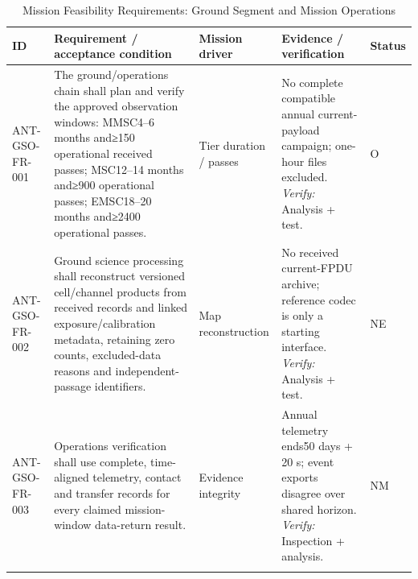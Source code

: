 \begin{table}[H]\centering\small\setlength{\tabcolsep}{3pt}
\caption{Mission Feasibility Requirements: Ground Segment and Mission Operations}\label{tab:fr-gso}
\begin{tabular}{@{}
>{\RaggedRight\arraybackslash}p{}
>{\RaggedRight\arraybackslash}p{}
>{\RaggedRight\arraybackslash}p{}
>{\RaggedRight\arraybackslash}p{}
>{\RaggedRight\arraybackslash}p{}
@{}}
\toprule ID & Requirement / acceptance condition & Mission driver & Evidence / verification & Status\\\midrule
{}\label{req:ANT-GSO-FR-001}\mbox{ANT-GSO-}\newline\mbox{FR-001} & The ground/operations chain shall plan and verify the approved observation windows: MMSC4–6 months and≥150 operational received passes; MSC12–14 months and≥900 operational passes; EMSC18–20 months and≥2400 operational passes. & Tier duration / passes & No complete compatible annual current-payload campaign; one-hour files excluded. \emph{Verify:} Analysis + test. & O\\
\addlinespace[3pt]
\label{req:ANT-GSO-FR-002}\mbox{ANT-GSO-}\newline\mbox{FR-002} & Ground science processing shall reconstruct versioned cell/channel products from received records and linked exposure/calibration metadata, retaining zero counts, excluded-data reasons and independent-passage identifiers. & Map reconstruction & No received current-FPDU archive; reference codec is only a starting interface. \emph{Verify:} Analysis + test. & NE\\
\addlinespace[3pt]
\label{req:ANT-GSO-FR-003}\mbox{ANT-GSO-}\newline\mbox{FR-003} & Operations verification shall use complete, time-aligned telemetry, contact and transfer records for every claimed mission-window data-return result. & Evidence integrity & Annual telemetry ends50 days + 20 s; event exports disagree over shared horizon. \emph{Verify:} Inspection + analysis. & NM\\
\addlinespace[3pt]
\bottomrule
\end{tabular}
\end{table}
